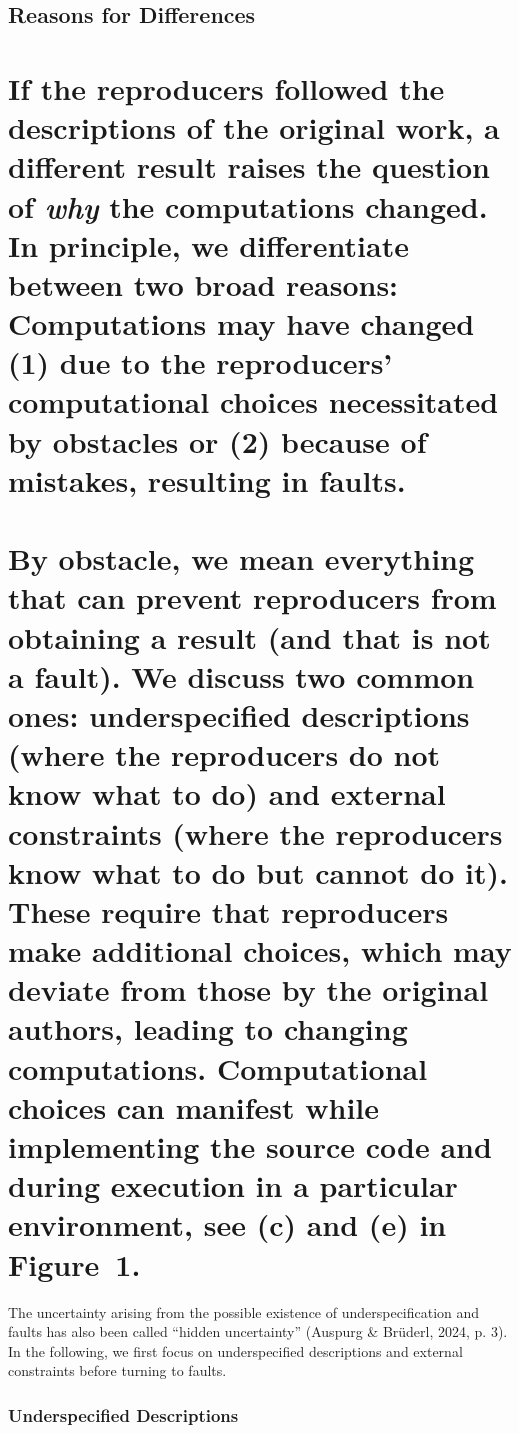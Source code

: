 \documentclass[authordate, empirical]{jote-new-article}
\begin{document}
	\subsection{Reasons for Differences}



	\section{If the reproducers followed the descriptions of the original work, a different result raises the question of \emph{why} the computations changed. In principle, we differentiate between two broad reasons: Computations may have changed (1) due to the reproducers' computational choices necessitated by obstacles or (2) because of mistakes, resulting in faults.}



	\section{By obstacle, we mean everything that can prevent reproducers from obtaining a result (and that is not a fault). We discuss two common ones: underspecified descriptions (where the reproducers do not know what to do) and external constraints (where the reproducers know what to do but cannot do it). These require that reproducers make additional choices, which may deviate from those by the original authors, leading to changing computations. Computational choices can manifest while implementing the source code and during execution in a particular environment, see (c) and (e) in Figure 1.}



	The uncertainty arising from the possible existence of underspecification and faults has also been called “hidden uncertainty” (Auspurg \& Brüderl, 2024, p. 3). In the following, we first focus on underspecified descriptions and external constraints before turning to faults.



	\subsubsection{Underspecified Descriptions}
\end{document}
